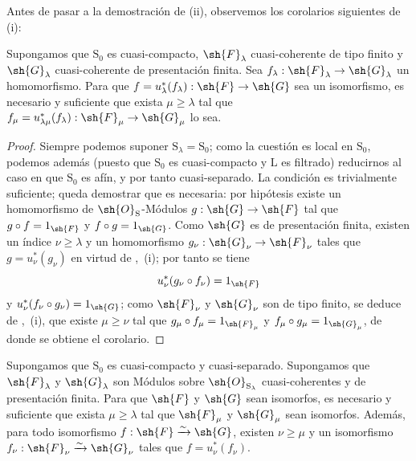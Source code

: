 Antes de pasar a la demostración de (ii), observemos los corolarios siguientes de (i):

\begin{corollary}[8.5.2.4]
\label{IV.8.5.2.4}
Supongamos que $\mathrm{S}_0$ es cuasi-compacto, $\sh{F}_\lambda$ cuasi-coherente de tipo finito y $\sh{G}_\lambda$ cuasi-coherente de presentación finita.
Sea $f_\lambda:\sh{F}_\lambda\to\sh{G}_\lambda$ un homomorfismo.
Para que $f=u_\lambda^*(f_\lambda):\sh{F}\to\sh{G}$ sea un isomorfismo, es necesario y suficiente que exista $\mu\geqslant\lambda$ tal que $f_\mu=u_{\lambda\mu}^*(f_\lambda):\sh{F}_\mu\to\sh{G}_\mu$ lo sea.
\end{corollary}

\begin{proof}
Siempre podemos suponer $\mathrm{S}_\lambda=\mathrm{S}_0$; como la cuestión es local en $\mathrm{S}_0$, podemos además (puesto que $\mathrm{S}_0$ es cuasi-compacto y $\mathrm{L}$ es filtrado) reducirnos al caso en que $\mathrm{S}_0$ es afín, y por tanto cuasi-separado.
La condición es trivialmente suficiente; queda demostrar que es necesaria: por hipótesis existe un homomorfismo de $\sh{O}_\mathrm{S}$-Módulos $g:\sh{G}\to\sh{F}$ tal que $g\circ f=1_\sh{F}$ y $f\circ g=1_\sh{G}$.
Como $\sh{G}$ es de presentación finita, existen un índice $\nu\geqslant\lambda$ y un homomorfismo $g_\nu:\sh{G}_\nu\to\sh{F}_\nu$ tales que $g=u_\nu^*(g_\nu)$ en virtud de ,~(i); por tanto se tiene
\[
  u_\nu^*(g_\nu\circ f_\nu)=1_\sh{F}
\]
y $u_\nu^*(f_\nu\circ g_\nu)=1_\sh{G}$; como $\sh{F}_\nu$ y $\sh{G}_\nu$ son de tipo finito, se deduce de ,~(i), que existe $\mu\geqslant\nu$ tal que $g_\mu\circ f_\mu=1_{\sh{F}_\mu}$ y $f_\mu\circ g_\mu=1_{\sh{G}_\mu}$, de donde se obtiene el corolario.
\end{proof}

\begin{corollary}[8.5.2.5]
\label{IV.8.5.2.5}
Supongamos que $\mathrm{S}_0$ es cuasi-compacto y cuasi-separado.
Supongamos que $\sh{F}_\lambda$ y $\sh{G}_\lambda$ son Módulos sobre $\sh{O}_{\mathrm{S}_\lambda}$ cuasi-coherentes y de presentación finita.
Para que $\sh{F}$ y $\sh{G}$ sean isomorfos, es necesario y suficiente que exista $\mu\geqslant\lambda$ tal que $\sh{F}_\mu$ y $\sh{G}_\mu$ sean isomorfos.
Además, para todo isomorfismo $f:\sh{F}\xrightarrow{\sim}\sh{G}$, existen $\nu\geqslant\mu$ y un isomorfismo $f_\nu:\sh{F}_\nu\xrightarrow{\sim}\sh{G}_\nu$ tales que $f=u_\nu^*(f_\nu)$.
\end{corollary}

